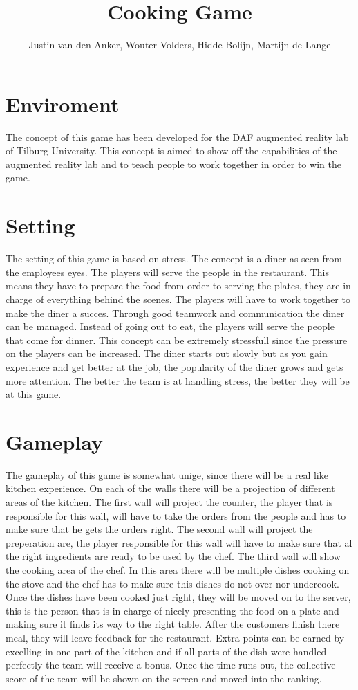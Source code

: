 \documentclass[10pt,a4paper]{article}
\author{Justin van den Anker, Wouter Volders, Hidde Bolijn, Martijn de Lange}
\title{Cooking Game}
\begin{document}
\maketitle

\section{Enviroment}
The concept of this game has been developed for the DAF augmented reality lab of Tilburg University. This concept is aimed to show off the capabilities of the augmented reality lab and to teach people to work together in order to win the game. 

\section{Setting}
The setting of this game is based on stress. The concept is a diner as seen from the employees eyes. The players will serve the people in the restaurant. This means they have to prepare the food from order to serving the plates, they are in charge of everything behind the scenes. The players will have to work together to make the diner a succes. Through good teamwork and communication the diner can be managed. Instead of going out to eat, the players will serve the people that come for dinner. This concept can be extremely stressfull since the pressure on the players can be increased. The diner starts out slowly but as you gain experience and get better at the job, the popularity of the diner grows and gets more attention. The better the team is at handling stress, the better they will be at this game.

\section{Gameplay}
The gameplay of this game is somewhat unige, since there will be a real like kitchen experience. On each of the walls there will be a projection of different areas of the kitchen. The first wall will project the counter, the player that is responsible for this wall, will have to take the orders from the people and has to make sure that he gets the orders right. The second wall will project the preperation are, the player responsible for this wall will have to make sure that al the right ingredients are ready to be used by the chef. The third wall will show the cooking area of the chef. In this area there will be multiple dishes cooking on the stove and the chef has to make sure this dishes do not over nor undercook. Once the dishes have been cooked just right, they will be moved on to the server, this is the person that is in charge of nicely presenting the food on a plate and making sure it finds its way to the right table. After the customers finish there meal, they will leave feedback for the restaurant. Extra points can be earned by excelling in one part of the kitchen and if all parts of the dish were handled perfectly the team will receive a bonus. Once the time runs out, the collective score of the team will be shown on the screen and moved into the ranking.
\end{document}
